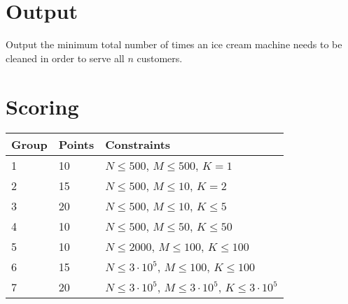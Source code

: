 \section*{Output}
Output the minimum total number of times an ice cream machine needs to be
cleaned in order to serve all $n$ customers.

\section*{Scoring}
\begin{tabular}{|l|l|l|}
    \hline
    Group & Points & Constraints \\ \hline
    1     &  10  & $N \leq 500$,          $M \leq 500$, $K = 1$ \\ \hline
    2     &  15  & $N \leq 500$,          $M \leq 10$, $K = 2$ \\ \hline
    3     &  20  & $N \leq 500$,          $M \leq 10$, $K \leq 5$ \\ \hline
    4     &  10  & $N \leq 500$,          $M \leq 50$, $K \leq 50$ \\ \hline
    5     &  10  & $N \leq 2000$,         $M \leq 100$, $K \leq 100$ \\ \hline
    6     &  15  & $N \leq 3 \cdot 10^5$, $M \leq 100$, $K \leq 100$ \\ \hline
    7     &  20  & $N \leq 3 \cdot 10^5$, $M \leq 3 \cdot 10^5$, $K \leq 3 \cdot 10^5$ \\ \hline
\end{tabular}

